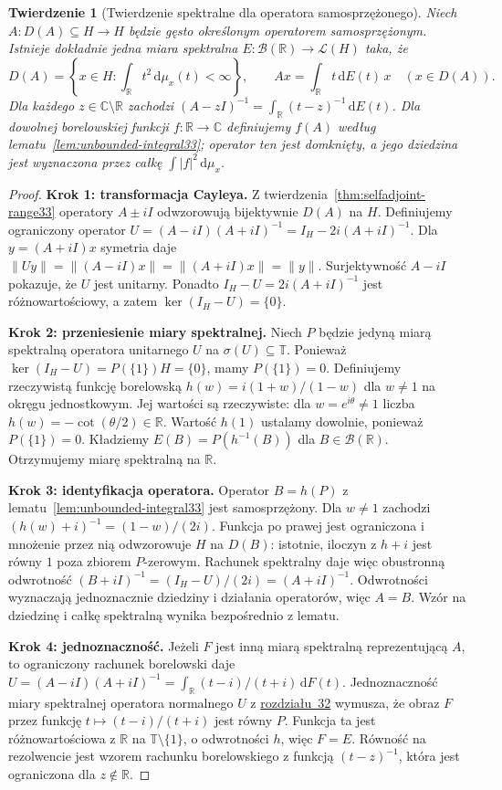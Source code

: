 \documentclass[11pt,a4paper]{article}
\numberwithin{equation}{section}
\theoremstyle{plain}
\newtheorem{twierdzenie}{Twierdzenie}[section]
\theoremstyle{definition}
\theoremstyle{remark}
\newcommand{\R}{\mathbb R}
\newcommand{\C}{\mathbb C}
\begin{document}
\begin{twierdzenie}[Twierdzenie spektralne dla operatora samosprzężonego]
\label{thm:unbounded-spectral33}
Niech $A:D(A)\subseteq H\to H$ będzie gęsto określonym
operatorem samosprzężonym. Istnieje dokładnie jedna miara spektralna
$E:\mathcal B(\R)\to\mathcal L(H)$ taka, że
\[
 D(A)=\left\{x\in H:\int_\R t^2\,\mathrm d\mu_x(t)<\infty\right\},
 \qquad Ax=\int_\R t\,\mathrm dE(t)\,x\quad(x\in D(A)).
\]
Dla każdego $z\in\C\setminus\R$ zachodzi
$(A-zI)^{-1}=\int_\R(t-z)^{-1}\,\mathrm dE(t)$.
Dla dowolnej borelowskiej funkcji $f:\R\to\C$
definiujemy $f(A)$ według
lematu~\ref{lem:unbounded-integral33}; operator ten jest domknięty,
a jego dziedzina jest wyznaczona przez całkę $\int|f|^2\,\mathrm d\mu_x$.
\end{twierdzenie}
\begin{proof}
\textbf{Krok 1: transformacja Cayleya.}
Z twierdzenia~\ref{thm:selfadjoint-range33} operatory
$A\pm iI$ odwzorowują bijektywnie $D(A)$ na $H$.
Definiujemy ograniczony operator
$U=(A-iI)(A+iI)^{-1}=I_H-2i(A+iI)^{-1}$.
Dla $y=(A+iI)x$ symetria daje
$\|Uy\|=\|(A-iI)x\|=\|(A+iI)x\|=\|y\|$.
Surjektywność $A-iI$ pokazuje, że $U$ jest unitarny.
Ponadto $I_H-U=2i(A+iI)^{-1}$ jest różnowartościowy,
a zatem $\ker(I_H-U)=\{0\}$.

\textbf{Krok 2: przeniesienie miary spektralnej.}
Niech $P$ będzie jedyną miarą spektralną operatora
unitarnego $U$ na $\sigma(U)\subseteq\mathbb T$.
Ponieważ $\ker(I_H-U)=P(\{1\})H=\{0\}$,
mamy $P(\{1\})=0$. Definiujemy rzeczywistą funkcję borelowską
$h(w)=i(1+w)/(1-w)$ dla $w\ne1$ na okręgu jednostkowym.
Jej wartości są rzeczywiste: dla $w=e^{i\theta}\ne1$
liczba $h(w)=-\cot(\theta/2)\in\R$.
Wartość $h(1)$ ustalamy dowolnie, ponieważ $P(\{1\})=0$.
Kładziemy $E(B)=P(h^{-1}(B))$ dla $B\in\mathcal B(\R)$.
Otrzymujemy miarę spektralną na $\R$.

\textbf{Krok 3: identyfikacja operatora.}
Operator $B=h(P)$ z lematu~\ref{lem:unbounded-integral33}
jest samosprzężony. Dla $w\ne1$ zachodzi
$(h(w)+i)^{-1}=(1-w)/(2i)$.
Funkcja po prawej jest ograniczona i mnożenie przez nią
odwzorowuje $H$ na $D(B)$: istotnie, iloczyn z $h+i$
jest równy $1$ poza zbiorem $P$-zerowym.
Rachunek spektralny daje więc obustronną odwrotność
$(B+iI)^{-1}=(I_H-U)/(2i)=(A+iI)^{-1}$.
Odwrotności wyznaczają jednoznacznie dziedziny i działania
operatorów, więc $A=B$. Wzór na dziedzinę i całkę
spektralną wynika bezpośrednio z lematu.

\textbf{Krok 4: jednoznaczność.}
Jeżeli $F$ jest inną miarą spektralną reprezentującą $A$,
to ograniczony rachunek borelowski daje
$U=(A-iI)(A+iI)^{-1}=\int_\R (t-i)/(t+i)\,\mathrm dF(t)$.
Jednoznaczność miary spektralnej operatora normalnego
$U$ z \hyperref[sec:spectral-hilbert32]{rozdziału~32} wymusza, że obraz $F$ przez funkcję
$t\mapsto(t-i)/(t+i)$ jest równy $P$.
Funkcja ta jest różnowartościowa z $\R$ na
$\mathbb T\setminus\{1\}$, o odwrotności $h$, więc $F=E$.
Równość na rezolwencie jest wzorem rachunku borelowskiego
z funkcją $(t-z)^{-1}$, która jest ograniczona dla $z\notin\R$.
\end{proof}
\end{document}
